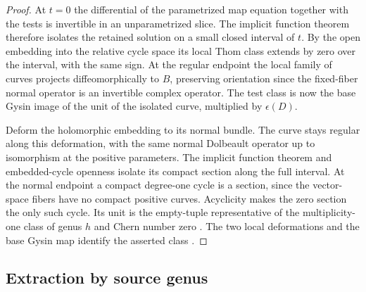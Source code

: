 \begin{proof}
At $t=0$ the differential of the parametrized map equation together
with the tests is invertible in an unparametrized slice. The implicit
function theorem therefore isolates the retained solution on a small
closed interval of $t$. By the open embedding into the relative
cycle space its local Thom class extends by zero over the interval,
with the same sign. At the regular endpoint the local family of
curves projects diffeomorphically to $B$, preserving orientation
since the fixed-fiber normal operator is an invertible complex
operator. The test class is now the base Gysin image of the unit of
the isolated curve, multiplied by $\epsilon(D)$.

Deform the holomorphic embedding to its normal bundle. The curve
stays regular along this deformation, with the same normal
Dolbeault operator up to isomorphism at the positive parameters.
The implicit function theorem and embedded-cycle openness isolate
its compact section along the full interval. At the normal endpoint
a compact degree-one cycle is a section, since the vector-space
fibers have no compact positive curves. Acyclicity makes the zero
section the only such cycle. Its unit is the empty-tuple
representative of the multiplicity-one class of genus $h$ and Chern
number zero \cite[Definition~4.7]{Pardon}. The two local
deformations and the base Gysin map identify the asserted class
\cite[\S\S2--3]{WueProduct}.
\end{proof}

\subsection{Extraction by source genus}

